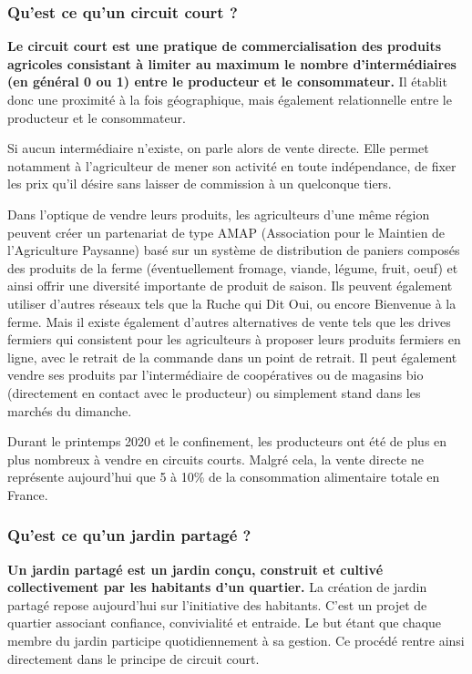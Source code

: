 \documentclass[french,a4paper]{article}
\begin{document}
\subsubsection{Qu’est ce qu’un circuit court ?}

\textbf{Le circuit court est une pratique de commercialisation des produits agricoles consistant à limiter au maximum le nombre d’intermédiaires (en général 0 ou 1) entre le producteur et le consommateur.} Il établit donc une proximité à la fois géographique, mais également relationnelle entre le producteur et le consommateur.

Si aucun intermédiaire n’existe, on parle alors de vente directe. Elle permet notamment à l’agriculteur de mener son activité en toute indépendance, de fixer les prix qu’il désire sans laisser de commission à un quelconque tiers.

Dans l’optique de vendre leurs produits, les agriculteurs d’une même région peuvent créer un partenariat de type AMAP (Association pour le Maintien de l'Agriculture Paysanne) basé sur un système de distribution de paniers  composés des produits de la ferme (éventuellement fromage, viande, légume, fruit, oeuf) et ainsi offrir une diversité importante de produit de saison. Ils peuvent également utiliser d'autres réseaux tels que la Ruche qui Dit Oui, ou encore Bienvenue à la ferme. Mais il existe également d’autres alternatives de vente tels que les drives fermiers qui consistent pour les agriculteurs à proposer leurs produits fermiers en ligne, avec le retrait de la commande dans un point de retrait. Il peut également vendre ses produits par l’intermédiaire de coopératives ou de magasins bio (directement en contact avec le producteur) ou simplement stand dans les marchés du dimanche.

Durant le printemps 2020 et le confinement, les producteurs ont été de plus en plus nombreux à vendre en circuits courts. Malgré cela, la vente directe ne représente aujourd’hui que 5 à 10\% de la consommation alimentaire totale en France.
\subsubsection{Qu’est ce qu’un jardin partagé ?}
\textbf{Un jardin partagé est un jardin conçu, construit et cultivé collectivement par les habitants d’un quartier.} La création de jardin partagé repose aujourd’hui sur l’initiative des habitants. C’est un projet de quartier associant confiance, convivialité et entraide. Le but étant que chaque membre du jardin participe quotidiennement à sa gestion. Ce procédé rentre ainsi directement dans le principe de circuit court. 
\end{document}
